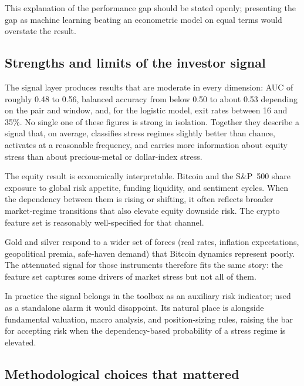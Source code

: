 This explanation of the performance gap should be stated openly; presenting the gap as machine learning beating an econometric model on equal terms would overstate the result.

\subsection{Strengths and limits of the investor signal}

The signal layer produces results that are moderate in every dimension: AUC of roughly 0.48 to 0.56, balanced accuracy from below 0.50 to about 0.53 depending on the pair and window, and, for the logistic model, exit rates between 16 and 35\%. No single one of these figures is strong in isolation. Together they describe a signal that, on average, classifies stress regimes slightly better than chance, activates at a reasonable frequency, and carries more information about equity stress than about precious-metal or dollar-index stress.

The equity result is economically interpretable. Bitcoin and the S\&P~500 share exposure to global risk appetite, funding liquidity, and sentiment cycles. When the dependency between them is rising or shifting, it often reflects broader market-regime transitions that also elevate equity downside risk. The crypto feature set is reasonably well-specified for that channel.

Gold and silver respond to a wider set of forces (real rates, inflation expectations, geopolitical premia, safe-haven demand) that Bitcoin dynamics represent poorly. The attenuated signal for those instruments therefore fits the same story: the feature set captures some drivers of market stress but not all of them.

In practice the signal belongs in the toolbox as an auxiliary risk indicator; used as a standalone alarm it would disappoint. Its natural place is alongside fundamental valuation, macro analysis, and position-sizing rules, raising the bar for accepting risk when the dependency-based probability of a stress regime is elevated.

\subsection{Methodological choices that mattered}

